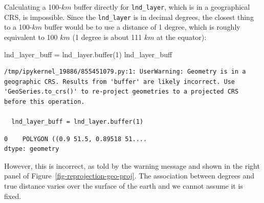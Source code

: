 \documentclass[
  letterpaper,
]{krantz}
\newenvironment{Shaded}{\begin{snugshade}}{\end{snugshade}}
\newcommand{\BuiltInTok}[1]{\textcolor[rgb]{0.00,0.23,0.31}{#1}}
\newcommand{\DecValTok}[1]{\textcolor[rgb]{0.68,0.00,0.00}{#1}}
\newcommand{\NormalTok}[1]{\textcolor[rgb]{0.00,0.23,0.31}{#1}}
\newcommand{\OperatorTok}[1]{\textcolor[rgb]{0.37,0.37,0.37}{#1}}
\begin{document}
Calculating a 100-\(km\) buffer directly for \texttt{lnd\_layer}, which
is in a geographical CRS, is impossible. Since the \texttt{lnd\_layer}
is in decimal degrees, the closest thing to a 100-\(km\) buffer would be
to use a distance of 1 degree, which is roughly equivalent to 100 \(km\)
(1 degree is about 111 \(km\) at the equator):

\begin{Shaded}
\begin{Highlighting}[]
\NormalTok{lnd\_layer\_buff }\OperatorTok{=}\NormalTok{ lnd\_layer.}\BuiltInTok{buffer}\NormalTok{(}\DecValTok{1}\NormalTok{)}
\NormalTok{lnd\_layer\_buff}
\end{Highlighting}
\end{Shaded}

\begin{verbatim}
/tmp/ipykernel_19886/855451079.py:1: UserWarning: Geometry is in a geographic CRS. Results from 'buffer' are likely incorrect. Use 'GeoSeries.to_crs()' to re-project geometries to a projected CRS before this operation.

  lnd_layer_buff = lnd_layer.buffer(1)
\end{verbatim}

\begin{verbatim}
0    POLYGON ((0.9 51.5, 0.89518 51....
dtype: geometry
\end{verbatim}

However, this is incorrect, as told by the warning message and shown in
the right panel of Figure~\ref{fig-reprojection-geo-proj}. The
association between degrees and true distance varies over the surface of
the earth and we cannot assume it is fixed.
\end{document}
